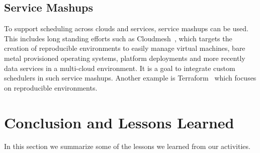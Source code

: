 \documentclass[final,5p,times,twocolumn]{elsarticle}
\begin{document}
\subsection{Service Mashups} 
\label{sec:mesh}

To support scheduling across clouds and services, service mashups can
be used. This includes long standing efforts such as Cloudmesh~\cite{von2014accessing}, which
targets the creation of reproducible environments to easily manage
virtual machines, bare metal provisioned operating systems, platform
deployments and more recently data services in a multi-cloud
environment. It is a goal to integrate custom schedulers in such
service mashups. Another example is Terraform~\cite{www-terraform}
which focuses on reproducible environments.






\section{Conclusion and Lessons Learned}\label{sec:conclusion}



In this section we summarize some of the lessons we learned from our activities.
\end{document}
